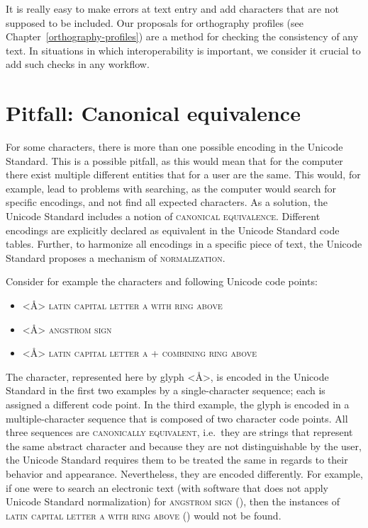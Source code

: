 It is really easy to make errors at text entry and add characters that are 
not supposed to be included. Our proposals for orthography profiles (see
Chapter~\ref{orthography-profiles}) are a method for checking the consistency of 
any text. In situations in which interoperability is important, we consider it 
crucial to add such checks in any workflow.

\section{Pitfall: Canonical equivalence}
\label{pitfall-canonical-equivalence}

For some characters, there is more than one possible encoding in the Unicode
Standard. This is a possible pitfall, as this would mean that for the computer
there exist multiple different entities that for a user are the same. This
would, for example, lead to problems with searching, as the computer would
search for specific encodings, and not find all expected characters. As a
solution, the Unicode Standard includes a notion of \textsc{canonical
equivalence}. Different encodings are explicitly declared as equivalent in the
Unicode Standard code tables. Further, to harmonize all encodings in a specific
piece of text, the Unicode Standard proposes a mechanism of
\textsc{normalization}.

Consider for example the characters and following Unicode code points:
\begin{itemize}
	\def\labelenumi{\arabic{enumi}.} 
	\item[] <Å> \textsc{latin capital letter a with ring above}  
	\item[] <Å> \textsc{angstrom sign} 
	\item[] <Å> \textsc{latin capital letter a} 
	+ \textsc{combining ring above} 
\end{itemize}

The character, represented here by glyph <Å>, is encoded in the Unicode Standard
in the first two examples by a single-character sequence; each is assigned a
different code point. In the third example, the glyph is encoded in a
multiple-character sequence that is composed of two character code points. All
three sequences are \textsc{canonically equivalent}, i.e.~they are strings that
represent the same abstract character and because they are not distinguishable
by the user, the Unicode Standard requires them to be treated the same in
regards to their behavior and appearance. Nevertheless, they are encoded
differently. For example, if one were to search an electronic text (with
software that does not apply Unicode Standard normalization) for
\textsc{angstrom sign} (), then the instances of \textsc{latin 
capital letter a with ring above} () would not be found.

